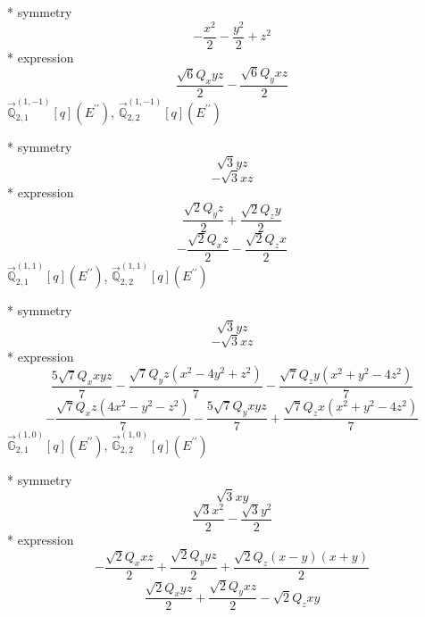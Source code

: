 \documentclass[fleqn,8pt]{jsarticle}
\begin{document}
\noindent\quad ** symmetry
\begin{dmath*}
- \frac{x^{2}}{2} - \frac{y^{2}}{2} + z^{2}
\end{dmath*}
\noindent\quad ** expression
\begin{dmath*}
\frac{\sqrt{6} Q_{x} y z}{2} - \frac{\sqrt{6} Q_{y} x z}{2}
\end{dmath*}
\noindent\quad $\vec{\mathbb{Q}}_{2,1}^{(1,-1)}[q](E^{\prime\prime})$, $\vec{\mathbb{Q}}_{2,2}^{(1,-1)}[q](E^{\prime\prime})$

\noindent\quad ** symmetry
\begin{dmath*}
\sqrt{3} y z
\end{dmath*}
\begin{dmath*}
- \sqrt{3} x z
\end{dmath*}
\noindent\quad ** expression
\begin{dmath*}
\frac{\sqrt{2} Q_{y} z}{2} + \frac{\sqrt{2} Q_{z} y}{2}
\end{dmath*}
\begin{dmath*}
- \frac{\sqrt{2} Q_{x} z}{2} - \frac{\sqrt{2} Q_{z} x}{2}
\end{dmath*}
\noindent\quad $\vec{\mathbb{Q}}_{2,1}^{(1,1)}[q](E^{\prime\prime})$, $\vec{\mathbb{Q}}_{2,2}^{(1,1)}[q](E^{\prime\prime})$

\noindent\quad ** symmetry
\begin{dmath*}
\sqrt{3} y z
\end{dmath*}
\begin{dmath*}
- \sqrt{3} x z
\end{dmath*}
\noindent\quad ** expression
\begin{dmath*}
\frac{5 \sqrt{7} Q_{x} x y z}{7} - \frac{\sqrt{7} Q_{y} z \left(x^{2} - 4 y^{2} + z^{2}\right)}{7} - \frac{\sqrt{7} Q_{z} y \left(x^{2} + y^{2} - 4 z^{2}\right)}{7}
\end{dmath*}
\begin{dmath*}
- \frac{\sqrt{7} Q_{x} z \left(4 x^{2} - y^{2} - z^{2}\right)}{7} - \frac{5 \sqrt{7} Q_{y} x y z}{7} + \frac{\sqrt{7} Q_{z} x \left(x^{2} + y^{2} - 4 z^{2}\right)}{7}
\end{dmath*}
\noindent\quad $\vec{\mathbb{G}}_{2,1}^{(1,0)}[q](E^{\prime\prime})$, $\vec{\mathbb{G}}_{2,2}^{(1,0)}[q](E^{\prime\prime})$

\noindent\quad ** symmetry
\begin{dmath*}
\sqrt{3} x y
\end{dmath*}
\begin{dmath*}
\frac{\sqrt{3} x^{2}}{2} - \frac{\sqrt{3} y^{2}}{2}
\end{dmath*}
\noindent\quad ** expression
\begin{dmath*}
- \frac{\sqrt{2} Q_{x} x z}{2} + \frac{\sqrt{2} Q_{y} y z}{2} + \frac{\sqrt{2} Q_{z} \left(x - y\right) \left(x + y\right)}{2}
\end{dmath*}
\begin{dmath*}
\frac{\sqrt{2} Q_{x} y z}{2} + \frac{\sqrt{2} Q_{y} x z}{2} - \sqrt{2} Q_{z} x y
\end{dmath*}
\end{document}
